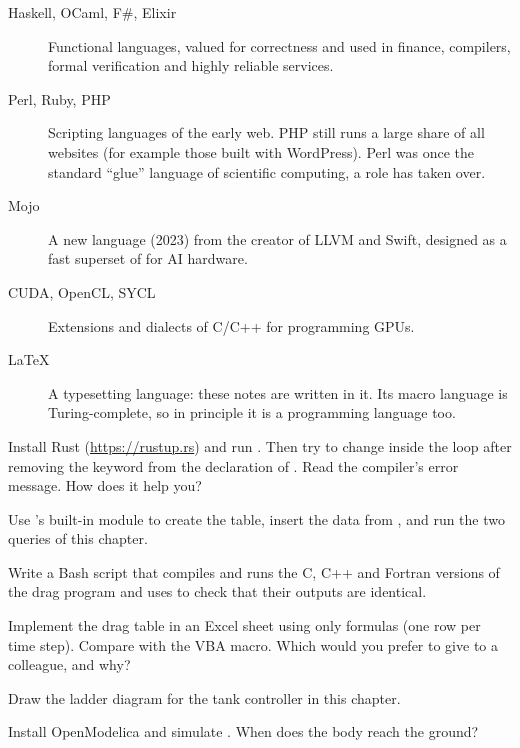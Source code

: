 \begin{description}
\item[Haskell, OCaml, F\#, Elixir] Functional languages, valued for correctness and used in
  finance, compilers, formal verification and highly reliable services.
\item[Perl, Ruby, PHP] Scripting languages of the early web. PHP still runs a large share of all websites (for example those built with WordPress). Perl was once the standard
  ``glue'' language of scientific computing, a role \py has taken over.
\item[Mojo] A new language (2023) from the creator of LLVM and Swift, designed as a fast
  superset of \py for AI hardware.
\item[CUDA, OpenCL, SYCL] Extensions and dialects of C/C++ for programming GPUs.
\item[\LaTeX] A typesetting language: these notes are written in it. Its macro language is
  Turing-complete, so in principle it is a programming language too.
\end{description}

\begin{exercises}
\item Install Rust (\url{https://rustup.rs}) and run . Then try to change
   inside the loop after removing the  keyword from the declaration
  of . Read the compiler's error message. How does it help you?
\item Use \py's built-in  module to create the  table, insert
  the data from , and run the two queries of this chapter.
\item Write a Bash script that compiles and runs the C, C++ and Fortran versions of the drag
  program and uses  to check that their outputs are identical.
\item Implement the drag table in an Excel sheet using only formulas (one row per time
  step). Compare with the VBA macro. Which would you prefer to give to a colleague, and why?
\item Draw the ladder diagram for the tank controller in this chapter.
\item Install OpenModelica and simulate . When does the body reach the
  ground?
\end{exercises}
